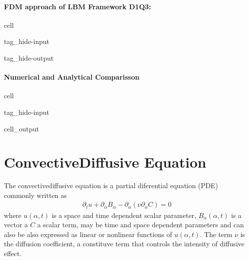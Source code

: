 \documentclass[letterpaper,10pt,english,openany,oneside]{jupyterBook}
\begin{document}
\subsubsection{FDM approach of LBM Framework D1Q3:}
\label{\detokenize{LBM-Study/Convective-Equation:fdm-approach-of-lbm-framework-d1q3}}
\begin{sphinxuseclass}{cell}
\begin{sphinxuseclass}{tag_hide-input}
\begin{sphinxuseclass}{tag_hide-output}
\end{sphinxuseclass}
\end{sphinxuseclass}
\end{sphinxuseclass}

\subsubsection{Numerical and Analytical Comparisson}
\label{\detokenize{LBM-Study/Convective-Equation:id3}}
\begin{sphinxuseclass}{cell}
\begin{sphinxuseclass}{tag_hide-input}\begin{sphinxVerbatimOutput}

\begin{sphinxuseclass}{cell_output}
\noindent{}

\end{sphinxuseclass}\end{sphinxVerbatimOutput}

\end{sphinxuseclass}
\end{sphinxuseclass}
\sphinxstepscope


\chapter{Convective\sphinxhyphen{}Diffusive Equation}
\label{\detokenize{LBM-Study/Convective-Diffusive-Equation:convective-diffusive-equation}}\label{\detokenize{LBM-Study/Convective-Diffusive-Equation::doc}}
\sphinxAtStartPar
The convective\sphinxhyphen{}diffusive equation is a partial diferential equation (PDE) commonly written as
\begin{equation}\label{equation:LBM-Study/Convective-Diffusive-Equation:cvdif-eq-lb}
\begin{split}
\partial_t u + \partial_{\alpha}B_{\alpha} - \partial_{\alpha}\left(\nu \partial_{\alpha} C \right)  = 0
\end{split}
\end{equation}
\sphinxAtStartPar
where \(u(\alpha,t)\) is a space and time dependent scalar parameter, \(B_{\alpha}(\alpha,t)\) is a vector a \(C\) a scalar term, may be time and space dependent parameters and can also be also expressed as linear or non\sphinxhyphen{}linear functions of \(u(\alpha,t)\). The term \(\nu\) is the diffusion coefficient, a constituve term that controls the intensity of diffusive effect.
\end{document}
